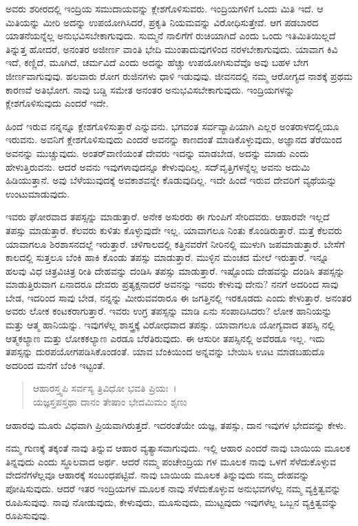 ಅವರು ಶರೀರದಲ್ಲಿ ಇಂದ್ರಿಯ ಸಮುದಾಯವನ್ನು ಕ್ಲೇಶಗೊಳಿಸುವರು. ಇಂದ್ರಿಯಗಳಿಗೆ ಒಂದು ಮಿತಿ ಇದೆ. ಆ ಮಿತಿಯನ್ನು ಮೀರಿ ಅದನ್ನು ಉಪಯೋಗಿಸಿದರೆ, ಪ್ರಕೃತಿ ನಿಯಮವನ್ನು ವಿರೋಧಿಸುತ್ತೇವೆ. ಆಗ ಪಡಬಾರದ ಯಾತನೆಯನ್ನೆಲ್ಲ ಅನುಭವಿಸಬೇಕಾಗುವುದು. ಸುಮ್ಮನೆ ನಾಲಿಗೆಗೆ ರುಚಿಯಾಗಿದೆ ಎಂದು ಒಂದು ಇತಿಮಿತಿಯಿಲ್ಲದೆ ತಿನ್ನುತ್ತ ಹೋದರೆ, ಅನಂತರ ಅಜೀರ್ಣ ವಾಂತಿ ಭೇದಿ ಮುಂತಾದುವುಗಳಿಂದ ನರಳಬೇಕಾಗುವುದು. ಯಾವಾಗ ಕಿವಿ ಇದೆ, ಕಣ್ಣಿದೆ, ಮೂಗಿದೆ, ಚರ್ಮವಿದೆ ಎಂದು ಅದನ್ನು ಹೆಚ್ಚು ಉಪಯೋಗಿಸುವೆವೊ ಅವು ಬಹಳ ಬೇಗ ಜೀರ್ಣವಾಗುವುವು. ಹಲವಾರು ರೋಗ ರುಜಿನಗಳು ಧಾಳಿ ಇಡುವುವು. ಜೀವನದಲ್ಲಿ ನಮ್ಮ ಆರೋಗ್ಯದ ನಾಶಕ್ಕೆ ಪ್ರಥಮ ಕಾರಣವೆ ಅತಿಭೋಗ. ನಾವು ಬಡ್ಡಿ ಸಮೇತ ಅನಂತರ ಅನುಭವಿಸಬೇಕಾಗುವುದು. ಇಂದ್ರಿಯಗಳನ್ನು ಕ್ಲೇಶಗೊಳಿಸುವುದು ಎಂದರೆ ಇದೇ.

ಹಿಂದೆ ಇರುವ ನನ್ನನ್ನೂ ಕ್ಲೇಶಗೊಳಿಸುತ್ತಾರೆ ಎನ್ನುವನು. ಭಗವಂತ ಸರ್ವವ್ಯಾಪಿಯಾಗಿ ಎಲ್ಲರ ಅಂತರಾಳದಲ್ಲಿಯೂ ಇರುವನು. ಅವನಿಗೆ ಕ್ಲೇಶಗೊಳಿಸುವುದು ಎಂದರೆ ಅವನನ್ನು ಕಾಣದಂತೆ ಮಾಡಿಕೊಳ್ಳುವುದು, ಅಜ್ಞಾನದ ತೆರೆಯಿಂದ ಅವನನ್ನು ಮುಚ್ಚುವುದು. ಅಂತರ್​ವಾಣಿಯಂತೆ ದೇವರು ಇದನ್ನು ಮಾಡಬೇಡ, ಅದನ್ನು ಮಾಡು ಎಂದು ಹೇಳುತ್ತಿರುವನು. ಆದರೆ ಅವನು ಇವುಗಳಾವುದನ್ನೂ ಕೇಳುವುದಿಲ್ಲ. ಸದ್​ವೃತ್ತಿಗಳನ್ನೆಲ್ಲ ಅವನು ಅದುಮಿ ಹಿಡಿಯುತ್ತಾನೆ. ಅವು ಬೆಳೆಯುವುದಕ್ಕೆ ಅವಕಾಶವನ್ನೇ ಕೊಡುವುದಿಲ್ಲ. ಇದೇ ಹಿಂದೆ ಇರುವ ದೇವರಿಗೆ ವ್ಯಥೆಯನ್ನು ಉಂಟುಮಾಡುವುದು.

ಇವರು ಘೋರವಾದ ತಪಸ್ಸನ್ನು ಮಾಡುತ್ತಾರೆ. ಅನೇಕ ಅಸುರರು ಈ ಗುಂಪಿಗೆ ಸೇರಿದವರು. ಆಹಾರವೇ ಇಲ್ಲದೆ ತಪಸ್ಸು ಮಾಡುತ್ತಾರೆ. ಕೆಲವರು ಕುಳಿತು ಕೊಳ್ಳುವುದೇ ಇಲ್ಲ. ಯಾವಾಗಲೂ ನಿಂತು ಕೊಂಡಿರುತ್ತಾರೆ. ಮತ್ತೆ ಕೆಲವರು ಯಾವಾಗಲೂ ಶಿರಶಾಸನದಲ್ಲೆ ಇರುತ್ತಾರೆ. ಚಳಿಗಾಲದಲ್ಲಿ ಕತ್ತಿನವರೆಗೆ ನೀರಿನಲ್ಲಿ ಮುಳುಗಿ ಜಪಮಾಡುತ್ತಾರೆ. ಬೇಸೆಗೆ ಕಾಲದಲ್ಲಿ ಸುತ್ತಲೂ ಬೆಂಕಿ ಹಾಕಿ ಕೊಂಡು ತಪಸ್ಸು ಮಾಡುತ್ತಾರೆ. ಮುಳ್ಳಿನ ಮಂಚದ ಮೇಲೆ ಇರುತ್ತಾರೆ. ಇನ್ನೂ ಹಲವು ವಿಧ ಚಿತ್ರವಿಚಿತ್ರ ರೀತಿ ದೇಹವನ್ನು ದಂಡಿಸಿ ತಪಸ್ಸು ಮಾಡುತ್ತಾರೆ. ಇಷ್ಟೊಂದು ದೇಹವನ್ನು ದಂಡಿಸಿ ತಪಸ್ಸನ್ನು ಮಾಡುತ್ತಿರುವಾಗ ಏನಾದರೂ ದೇವರು ಪ್ರತ್ಯಕ್ಷನಾದರೆ ಅವನನ್ನು ಇವರು ಕೇಳುವು ದೇನು? ನನಗೆ ಅದರಿಂದ ಸಾವು ಬೇಡ, ಇದರಿಂದ ಸಾವು ಬೇಡ, ನನ್ನನ್ನು ಮೀರುವವರಾರೂ ಈ ಜಗತ್ತಿನಲ್ಲಿ ಇರಕೂಡದು ಎಂದು ಕೇಳುತ್ತಾರೆ. ಅನಂತರ ಅವರು ಲೋಕ ಕಂಟಕರಾಗುತ್ತಾರೆ. ಇವರು ಉಗ್ರ ತಪಸ್ಸನ್ನು ಮಾಡಿ ಏನು ಸಂಪಾದಿಸಿದರು? ಲೋಕ ಹಾನಿಯನ್ನು ಮತ್ತು ಆತ್ಮ ಹಾನಿಯನ್ನು. ಇವುಗಳೆಲ್ಲ ಶಾಸ್ತ್ರಕ್ಕೆ ವಿರೋಧವಾದ ತಪಸ್ಸು. ಯಾವಾಗಲೂ ಯೋಗ್ಯವಾದ ತಪಸ್ಸಿ ನಲ್ಲಿ ಆತ್ಮಕಲ್ಯಾಣ ಮತ್ತು ಲೋಕಕಲ್ಯಾಣ ಎರಡೂ ಬೆರೆತಿರುವುದು. ಈ ಆಸುರೀ ತಪಸ್ಸಿನಲ್ಲಿ ಅವೆರಡೂ ಇಲ್ಲ. ಇದು ತಪಸ್ಸನ್ನು ದುರಪಯೋಗಪಡಿಸಿಕೊಂಡಂತೆ. ಯಾವ ಬೆಂಕಿಯಿಂದ ಅನ್ನವನ್ನು ಬೇಯಿಸಿ ಊಟ ಮಾಡಬಹುದೊ ಅದರಿಂದ ಮನೆಗೆ ಬೆಂಕಿ ಇಟ್ಟಂತೆ.

\begin{verse}
ಆಹಾರಸ್ತ್ವಪಿ ಸರ್ವಸ್ಯ ತ್ರಿವಿಧೋ ಭವತಿ ಪ್ರಿಯಃ~।\\ಯಜ್ಞಸ್ತಪಸ್ತಥಾ ದಾನಂ ತೇಷಾಂ ಭೇದಮಿಮಂ ಶೃಣು 
\end{verse}

{\small ಆಹಾರವು ಮೂರು ವಿಧವಾಗಿ ಪ್ರಿಯವಾಗಿರುತ್ತದೆ. ಇದರಂತೆಯೇ ಯಜ್ಞ, ತಪಸ್ಸು, ದಾನ ಇವುಗಳ ಭೇದವನ್ನು ಕೇಳು.}

ನಮ್ಮ ಗುಣಕ್ಕೆ ತಕ್ಕಂತೆ ನಾವು ತಿನ್ನುವ ಆಹಾರ ವ್ಯತ್ಯಾಸವಾಗುವುದು. ಇಲ್ಲಿ ಆಹಾರ ಎಂದರೆ ನಾವು ಬಾಯಿಯ ಮೂಲಕ ತಿನ್ನವುದು ಎಂದು ಸ್ಥೂಲವಾದ ಅರ್ಥ. ಆದರೆ ನಮ್ಮ ಪಂಚೇಂದ್ರಿಯ ಗಳ ಮೂಲಕ ನಾವು ಒಳಗೆ ಸೆಳೆದುಕೊಳ್ಳುವ ವೇದನೆಗಳೆಲ್ಲವೂ ಆಹಾರಕ್ಕೆ ಸಂಬಂಧಪಟ್ಟಿವೆ. ನಾವು ಬಾಯಿಯ ಮೂಲಕ ತಿನ್ನುವುದು ನಮ್ಮ ದೇಹವನ್ನು ಪೋಷಿಸುವುದು. ಆದರೆ ಇತರ ಇಂದ್ರಿಯಗಳ ಮೂಲಕ ನಾವು ಸೆಳೆದುಕೊಳ್ಳುವ ಅನುಭವಗಳೆಲ್ಲ ನಮ್ಮ ವ್ಯಕ್ತಿತ್ವವನ್ನು ರೂಪಿಸುವುವು. ನಾವು ನೋಡುವುದು, ಕೇಳುವುದು, ಮೂಸುವುದು, ಮುಟ್ಟವುದು ಇವುಗಳೆಲ್ಲ ಒಬ್ಬನ ವ್ಯಕ್ತಿತ್ವವನ್ನು ರೂಪಿಸುವುವು.

